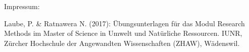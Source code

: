 \begin{titlepage}
\newpage
\thispagestyle{empty}
\begin{minipage}{15cm}
\begin{flushleft}




\vspace{18cm}
{\large Impressum:}

\vspace{0.5cm}

Laube, P. \& Ratnawera N. (2017): Übungsunterlagen für das Modul Research Methods im Master of Science in Umwelt und Natürliche Ressourcen. IUNR, Zürcher Hochschule der Angewandten Wissenschaften (ZHAW), W{\"a}denswil.

\end{flushleft}
\end{minipage}

\end{titlepage}
\restoregeometry